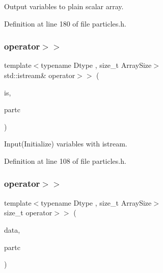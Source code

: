 Output variables to plain scalar array. 



Definition at line 180 of file particles.\+h.

\mbox{\label{class_vel_indep_particles_a26d445a8934430c0634f60e387853724}} 
\subsubsection{\texorpdfstring{operator$>$$>$}{operator>>}\hspace{0.1cm}{\footnotesize\ttfamily [1/2]}}
{\footnotesize\ttfamily template$<$typename Dtype , size\+\_\+t Array\+Size$>$ \\
std\+::istream\& operator$>$$>$ (\begin{DoxyParamCaption}\item[{std\+::istream \&}]{is,  }\item[{\mbox{\hyperlink{class_vel_indep_particles}{Vel\+Indep\+Particles}}$<$ Dtype, Array\+Size $>$ \&}]{partc }\end{DoxyParamCaption})\hspace{0.3cm}{\ttfamily [friend]}}



Input(\+Initialize) variables with istream. 



Definition at line 108 of file particles.\+h.

\mbox{\label{class_vel_indep_particles_a1d6b6d70a1740a4887fe85aa75084d7f}} 
\subsubsection{\texorpdfstring{operator$>$$>$}{operator>>}\hspace{0.1cm}{\footnotesize\ttfamily [2/2]}}
{\footnotesize\ttfamily template$<$typename Dtype , size\+\_\+t Array\+Size$>$ \\
size\+\_\+t operator$>$$>$ (\begin{DoxyParamCaption}\item[{\mbox{\hyperlink{class_vel_indep_particles_a6bba8ac3f941a144214037a27ccaa119}{Dyn\+Scalar\+Array}} \&}]{data,  }\item[{\mbox{\hyperlink{class_vel_indep_particles}{Vel\+Indep\+Particles}}$<$ Dtype, Array\+Size $>$ \&}]{partc }\end{DoxyParamCaption})\hspace{0.3cm}{\ttfamily [friend]}}



